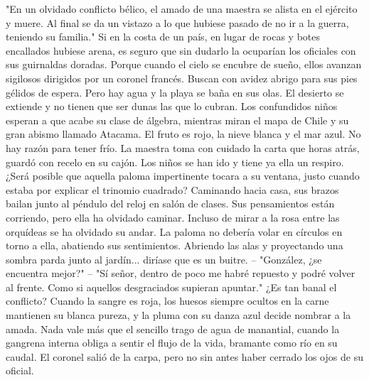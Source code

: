 \markdownRendererInterblockSeparator
{}"En un olvidado conflicto bélico, el amado de una maestra se alista en el ejército y muere. Al final se da un vistazo a lo que hubiese pasado de no ir a la guerra, teniendo su familia."\markdownRendererInterblockSeparator
{}\markdownRendererInterblockSeparator
{}Si en la costa de un país, en lugar de rocas y botes encallados hubiese arena, es seguro que sin dudarlo la ocuparían los oficiales con sus guirnaldas doradas. Porque cuando el cielo se encubre de sueño, ellos avanzan sigilosos dirigidos por un coronel francés. Buscan con avidez abrigo para sus pies gélidos de espera. Pero hay agua y la playa se baña en sus olas. El desierto se extiende y no tienen que ser dunas las que lo cubran. Los confundidos niños esperan a que acabe su clase de álgebra, mientras miran el mapa de Chile y su gran abismo llamado Atacama. El fruto es rojo, la nieve blanca y el mar azul. No hay razón para tener frío. \markdownRendererInterblockSeparator
{}\markdownRendererInterblockSeparator
{}La maestra toma con cuidado la carta que horas atrás, guardó con recelo en su cajón. Los niños se han ido y tiene ya ella un respiro. ¿Será posible que aquella paloma impertinente tocara a su ventana, justo cuando estaba por explicar el trinomio cuadrado? Caminando hacia casa, sus brazos bailan junto al péndulo del reloj en salón de clases. Sus pensamientos están corriendo, pero ella ha olvidado caminar. Incluso de mirar a la rosa entre las orquídeas se ha olvidado su andar. La paloma no debería volar en círculos en torno a ella, abatiendo sus sentimientos. Abriendo las alas y proyectando una sombra parda junto al jardín... diríase que es un buitre. \markdownRendererInterblockSeparator
{}\markdownRendererInterblockSeparator
{}-- "González, ¿se encuentra mejor?" -- "Sí señor, dentro de poco me habré repuesto y podré volver al frente. Como si aquellos desgraciados supieran apuntar." ¿Es tan banal el conflicto? Cuando la sangre es roja, los huesos siempre ocultos en la carne mantienen su blanca pureza, y la pluma con su danza azul decide nombrar a la amada. Nada vale más que el sencillo trago de agua de manantial, cuando la gangrena interna obliga a sentir el flujo de la vida, bramante como río en su caudal. El coronel salió de la carpa, pero no sin antes haber cerrado los ojos de su oficial. \markdownRendererInterblockSeparator
{}\markdownRendererInterblockSeparator
